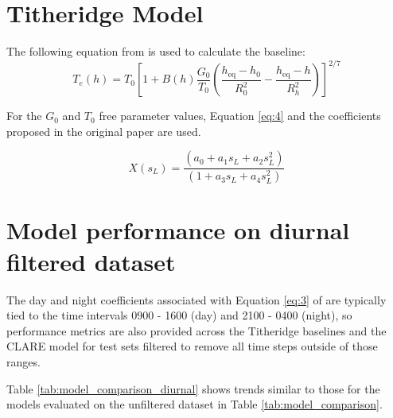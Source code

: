 \documentclass{agujournal2019}
\begin{document}
\section{Titheridge Model}
\label{titheridge-model}

The following equation from \cite{titheridge_temperatures_1998} is used to calculate the baseline:
\begin{equation}
T_e(h) = T_0 \left[ 1 + B(h) \frac{G_0}{T_0} \left( \frac{h_{\text{eq}} - h_0}{R_0^2} - \frac{h_{\text{eq}} - h}{R_h^2} \right) \right]^{2/7}
\label{eq:3}
\end{equation}

For the $G_0$ and $T_0$ free parameter values, Equation \ref{eq:4} and the coefficients proposed in the original paper are used.

\begin{equation}
X(s_L) = \frac{(a_0 + a_1 s_L + a_2 s_L^2)}{(1 + a_3 s_L + a_4 s_L^2)}
\label{eq:4}
\end{equation}



\section{Model performance on diurnal filtered dataset}
\label{model-performance-diurnal}
The day and night coefficients associated with Equation \ref{eq:3} of \cite{titheridge_temperatures_1998} are typically tied to the time intervals 0900 - 1600 (day) and 2100 - 0400 (night), so performance metrics are also provided across the Titheridge baselines and the CLARE model for test sets filtered to remove all time steps outside of those ranges.

Table \ref{tab:model_comparison_diurnal} shows trends similar to those for the models evaluated on the unfiltered dataset in Table \ref{tab:model_comparison}.
\end{document}
